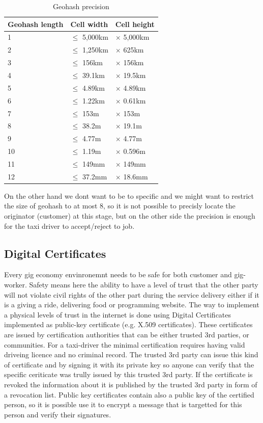 \documentclass{article}
\begin{document}
\begin{table}
	\centering
	\begin{tabular}{lll}
		\toprule
		Geohash length & Cell width & Cell height \\
		\midrule
		1  & $\le$ 5,000km & $\times$ 5,000km \\
		2  & $\le$ 1,250km & $\times$ 625km   \\
		3  & $\le$ 156km   & $\times$ 156km   \\
		4  & $\le$ 39.1km  & $\times$ 19.5km  \\
		5  & $\le$ 4.89km  & $\times$ 4.89km  \\
		6  & $\le$ 1.22km  & $\times$ 0.61km  \\
		7  & $\le$ 153m    & $\times$ 153m    \\
		8  & $\le$ 38.2m   & $\times$ 19.1m   \\
		9  & $\le$ 4.77m   & $\times$ 4.77m   \\
		10 & $\le$ 1.19m   & $\times$ 0.596m  \\
		11 & $\le$ 149mm   & $\times$ 149mm   \\
		12 & $\le$ 37.2mm  & $\times$ 18.6mm  \\
		\bottomrule
	\end{tabular}
	\caption{Geohash precision}
	\label{tab:geoprec}
\end{table}

On the other hand we dont want to be to specific and we might want to restrict the size of geohash to at most 8, so it is not possible to precisly locate the originator (customer) at this stage, but on the other side the precision is enough for the taxi driver to accept/reject to job.

\subsection{Digital Certificates}

Every gig economy envinronemnt needs to be safe for both customer and gig-worker. Safety means here the ability to have a level of trust that the other party will not violate civil rights of the other part during the service delivery either if it is a giving a ride, delivering food or programming website. The way to implement a physical levels of trust in the internet is done using Digital Certificates implemented as public-key certificate (e.g. X.509 certificates). These certificates are issued by certification authorities that can be either trusted 3rd parties, or communities. For a taxi-driver the minimal certification requires having valid driveing licence and no criminal record. The trusted 3rd party can issue this kind of certificate and by signing it with its private key so anyone can verify that the specific ceriticate was trully issued by this trusted 3rd party. If the certificate is revoked the information about it is published by the trusted 3rd party in form of a revocation list. Public key certificates contain also a public key of the certified person, so it is possible use it to encrypt a message that is targetted for this person and verify their signatures.
\end{document}
